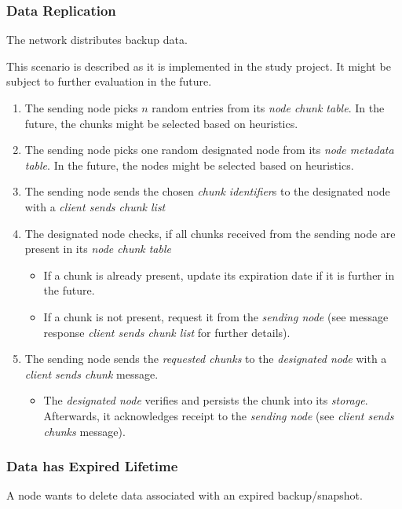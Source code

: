 \subsubsection{Data Replication}\label{sec:scenario-data-replication}
The network distributes backup data.

This scenario is described as it is implemented in the study project. It might be subject to further evaluation in the future.

\begin{enumerate}
    \item The sending node picks $n$ random entries from its \emph{node chunk table}. In the future, the chunks might be selected based on heuristics.
    \item The sending node picks one random designated node from its \emph{node metadata table}. In the future, the nodes might be selected based on heuristics. %
    \item The sending node sends the chosen \emph{chunk identifier}s to the designated node with a \emph{client sends chunk list} %
    \item The designated node checks, if all chunks received from the sending node are present in its \emph{node chunk table}
        \begin{itemize}
            \item If a chunk is already present, update its expiration date if it is further in the future.
            \item If a chunk is not present, request it from the \emph{sending node} (see message response \emph{client sends chunk list} for further details).
        \end{itemize}
    \item The sending node sends the \emph{requested chunks} to the \emph{designated node} with a \emph{client sends chunk} message. %
        \begin{itemize}
            \item The \emph{designated node} verifies and persists the chunk into its \emph{storage}. Afterwards, it acknowledges receipt to the \emph{sending node} (see \emph{client sends chunks} message).
        \end{itemize}
\end{enumerate}

\subsubsection{Data has Expired Lifetime}\label{sec:scenario-data-expiration}
A node wants to delete data associated with an expired backup/snapshot.

